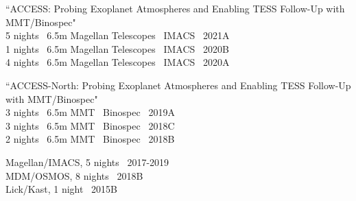 
\begin{cventries}
\raggedright{

	 ``ACCESS: Probing Exoplanet Atmospheres and Enabling TESS
		Follow-Up with MMT/Binospec"\\ 
		5 nights  \textbar\ 6.5m Magellan Telescopes \textbar\ IMACS \textbar\ 2021A \\
		1 nights  \textbar\ 6.5m Magellan Telescopes \textbar\ IMACS \textbar\ 2020B \\
		4 nights  \textbar\ 6.5m Magellan Telescopes \textbar\ IMACS \textbar\ 2020A
		
	 ``ACCESS-North: Probing Exoplanet Atmospheres and Enabling TESS
		Follow-Up with MMT/Binospec"\\ 
		3 nights \textbar\ 6.5m MMT \textbar\ Binospec \textbar\ 2019A \\
		3 nights \textbar\ 6.5m MMT \textbar\ Binospec \textbar\ 2018C \\
		2 nights \textbar\ 6.5m MMT \textbar\ Binospec \textbar\ 2018B


    Magellan/IMACS, 5 nights \textbar\ 2017-2019\\
    MDM/OSMOS, 8 nights \textbar\ 2018B\\
    Lick/Kast, 1 night \textbar\ 2015B
}

\end{cventries}